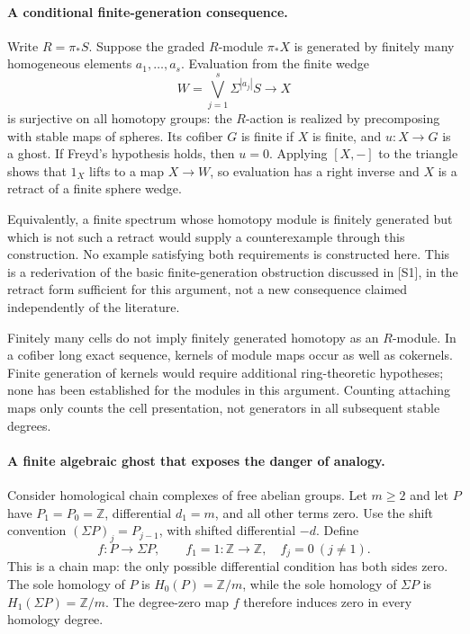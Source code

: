 \documentclass[11pt]{article}
\begin{document}
\paragraph{A conditional finite-generation consequence.}
Write $R=\pi_*S$. Suppose the graded $R$-module $\pi_*X$ is generated
by finitely many homogeneous elements $a_1,\ldots,a_s$. Evaluation from
the finite wedge
\[
                  W=\bigvee_{j=1}^s\Sigma^{|a_j|}S\longrightarrow X
\]
is surjective on all homotopy groups: the $R$-action is realized by
precomposing with stable maps of spheres. Its cofiber $G$ is finite if
$X$ is finite, and $u:X\to G$ is a ghost. If Freyd's hypothesis holds,
then $u=0$. Applying $[X,-]$ to the triangle shows that $1_X$ lifts to
a map $X\to W$, so evaluation has a right inverse and $X$ is a retract
of a finite sphere wedge.

Equivalently, a finite spectrum whose homotopy module is finitely
generated but which is not such a retract would supply a counterexample
through this construction. No example satisfying both requirements is
constructed here. This is a rederivation of the basic finite-generation
obstruction discussed in [S1], in the retract form sufficient for this
argument, not a new consequence claimed independently of the literature.

Finitely many cells do not imply finitely generated homotopy as an
$R$-module. In a cofiber long exact sequence, kernels of module maps
occur as well as cokernels. Finite generation of kernels would require
additional ring-theoretic hypotheses; none has been established for the
modules in this argument. Counting attaching maps only counts the cell
presentation, not generators in all subsequent stable degrees.

\paragraph{A finite algebraic ghost that exposes the danger of analogy.}
Consider homological chain complexes of free abelian groups. Let $m\ge2$
and let $P$ have $P_1=P_0=\mathbb Z$, differential $d_1=m$, and all
other terms zero. Use the shift convention
$(\Sigma P)_j=P_{j-1}$, with shifted differential $-d$. Define
\[
              f:P\longrightarrow\Sigma P,
              \qquad f_1=1:\mathbb Z\to\mathbb Z,
              \quad f_j=0\ (j\ne1).
\]
This is a chain map: the only possible differential condition has both
sides zero. The sole homology of $P$ is $H_0(P)=\mathbb Z/m$, while
the sole homology of $\Sigma P$ is $H_1(\Sigma P)=\mathbb Z/m$.
The degree-zero map $f$ therefore induces zero in every homology degree.
\end{document}
